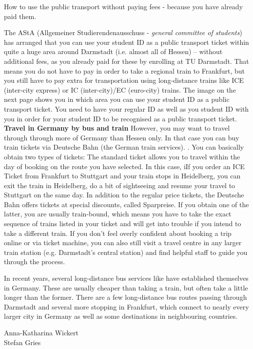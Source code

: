 {}
{How to use the public transport without paying fees - because you have already paid them.}
{The AStA (Allgemeiner Studierendenausschuss - \textit{general committee of students}) has arranged that you can use your student ID as a public transport ticket within quite a huge area around Darmstadt (i.e. almost all of Hessen) -- without additional fees, as you already paid for these by enrolling at TU Darmstadt.
    That means you do not have to pay in order to take a regional train to Frankfurt, but you still have to pay extra for transportation using long-distance trains like ICE (inter-city express) or IC (inter-city)/EC (euro-city) trains.
    The image on the next page shows you in which area you can use your student ID as a public transport ticket.
    You need to have your regular ID as well as you student ID with you in order for your student ID to be recognised as a public transport ticket.\\

    \noindent\textbf{Travel in Germany by bus and train}
    However, you may want to travel through through more of Germany than Hessen only.
    In that case you can buy train tickets via Deutsche Bahn (the German train services). \footnotemark[1].
    You can basically obtain two types of tickets:
    The standard ticket allows you to travel within the day of booking on the route you have selected.
    In this case, iIf you order an ICE Ticket from Frankfurt to Stuttgart and your train stops in Heidelberg, you can exit the train in Heidelberg, do a bit of sightseeing and resume your travel to Stuttgart on the same day.
    In addition to the regular price tickets, the Deutsche Bahn offers tickets at special discounts, called Sparpreise.
    If you obtain one of the latter, you are usually train-bound, which means you have to take the exact sequence of trains listed in your ticket and will get into trouble if you intend to take a different train.
    If you don't feel overly confident about booking a trip online or via ticket machine, you can also still visit a travel centre in any larger train station (e.g. Darmstadt's central station) and find helpful staff to guide you through the process.

    In recent years, several long-distance bus services like \footnotemark[2] \footnotemark[3] have established themselves in Germany.
    These are usually cheaper than taking a train, but often take a little longer than the former.
    There are a few long-distance bus routes passing through Darmstadt and several more stopping in Frankfurt, which connect to nearly every larger city in Germany as well as some destinations in neighbouring countries.
}
{Anna-Katharina Wickert\\Stefan Gries}


\newpage
